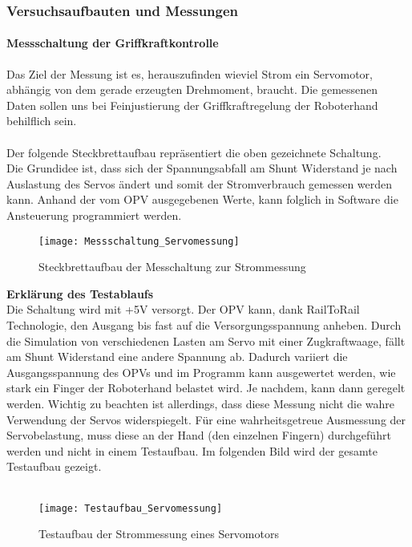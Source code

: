\documentclass[titlepage,12pt,twoside]{article}
\begin{document}
\subsubsection{Versuchsaufbauten und Messungen}
\paragraph{Messschaltung der Griffkraftkontrolle}
\hfill \break
\hfill \break
Das Ziel der Messung ist es, herauszufinden wieviel Strom ein Servomotor, abhängig von dem gerade erzeugten Drehmoment, 
braucht. Die gemessenen Daten sollen uns bei Feinjustierung der Griffkraftregelung der Roboterhand behilflich sein. \\
\\
Der folgende Steckbrettaufbau repräsentiert die oben gezeichnete Schaltung. \\
Die Grundidee ist, dass sich der Spannungsabfall am Shunt Widerstand je nach Auslastung des Servos ändert und somit der 
Stromverbrauch gemessen werden kann. Anhand der vom OPV ausgegebenen Werte, kann folglich in Software die Ansteuerung programmiert 
werden. \\
\begin{figure}[H]
	\begin{center}
		\scalebox{0.8}
		{\texttt{[image: Messschaltung\_Servomessung]}}
		\caption{Steckbrettaufbau der Messchaltung zur Strommessung}
		\label{fig:Messschaltung_Servomessung}		
	\end{center}
\end{figure}
\hfill \break
\textbf{Erklärung des Testablaufs}\\
Die Schaltung wird mit +5V versorgt. Der OPV  kann, dank RailToRail Technologie, den Ausgang bis fast auf die 
Versorgungsspannung anheben. Durch die Simulation von verschiedenen Lasten am Servo mit einer Zugkraftwaage, fällt am Shunt 
Widerstand eine andere Spannung ab. Dadurch variiert die Ausgangsspannung des OPVs und im Programm kann ausgewertet werden, 
wie stark ein Finger der Roboterhand belastet wird. Je nachdem, kann dann geregelt werden. 
Wichtig zu beachten ist allerdings, dass diese Messung nicht die wahre Verwendung der Servos widerspiegelt. Für eine 
wahrheitsgetreue Ausmessung der Servobelastung, muss diese an der Hand (den einzelnen Fingern) durchgeführt werden und nicht 
in einem Testaufbau. Im folgenden Bild wird der gesamte Testaufbau gezeigt. \\
\\
\begin{figure}[H]
	\begin{center}
		\scalebox{0.8}
		{\texttt{[image: Testaufbau\_Servomessung]}}
		\caption{Testaufbau der Strommessung eines Servomotors}
		\label{fig:Testaufbau_Servomessung}		
	\end{center}
\end{figure}
\end{document}
